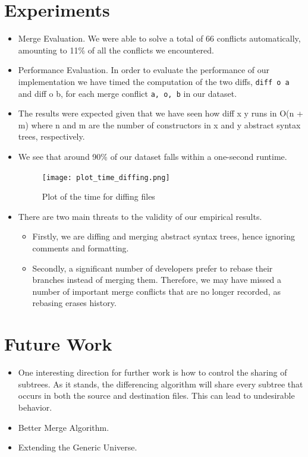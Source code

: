 \section{Experiments}
\begin{itemize}
    \item Merge Evaluation. We were able to solve a total of 66 conflicts automatically, amounting to 11\% of all the conflicts we encountered.
    \item Performance Evaluation. In order to evaluate the performance of our implementation we have timed the computation of the two diffs, \texttt{diff o a} and diff o b, for each merge conflict \texttt{a, o, b} in our dataset.
    \item The results were expected given that we have seen how diff x y runs in O(n + m) where n and m are the number of constructors in x and y abstract syntax trees, respectively.
    \item We see that around 90\% of our dataset falls within a one-second runtime.
    \begin{figure}[H]
        \centering
        \texttt{[image: plot\_time\_diffing.png]}
        \caption{Plot of the time for diffing files}
        \label{fig:diffing_time}
    \end{figure}
    \item There are two main threats to the validity of our empirical results. 
    \begin{itemize}
        \item Firstly, we are diffing and merging abstract syntax trees, hence ignoring comments and formatting.
        \item Secondly, a significant number of developers prefer to rebase their branches instead of merging them. Therefore, we may have missed a number of important merge conflicts that are no longer recorded, as rebasing erases history.
    \end{itemize}
\end{itemize}

\section{Future Work}
\begin{itemize}
    \item One interesting direction for further work is how to control the sharing of subtrees. As it stands, the differencing algorithm will share every subtree that occurs in both the source and destination files. This can lead to undesirable behavior.
    \item Better Merge Algorithm.
    \item Extending the Generic Universe.
\end{itemize}

